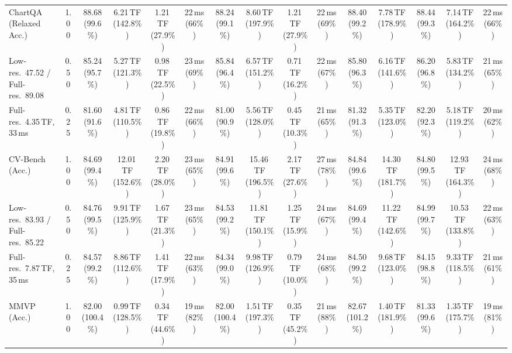 \begin{table}[t]
{\begin{tabular}{l c | c c c c | c c c c | c c | c c c}
\cmidrule(lr){1-15}
ChartQA (Relaxed Acc.) & 1.00 & \cellcolor{gray!15}88.68 (99.6\%) & 6.21\,TF (142.8\%) & 1.21\,TF (27.9\%) & 22\,ms (66\%) & \cellcolor{gray!15}88.24 (99.1\%) & 8.60\,TF (197.9\%) & 1.21\,TF (27.9\%) & 22\,ms (69\%) & \cellcolor{gray!15}88.40 (99.2\%) & 7.78\,TF (178.9\%) & \cellcolor{gray!15}88.44 (99.3\%) & 7.14\,TF (164.2\%) & 22\,ms (66\%) \\
{\footnotesize Low-res.\ 47.52 / Full-res.\ 89.08} & 0.50 & 85.24 (95.7\%) & 5.27\,TF (121.3\%) & 0.98\,TF (22.5\%) & 23\,ms (69\%) & 85.84 (96.4\%) & 6.57\,TF (151.2\%) & 0.71\,TF (16.2\%) & 22\,ms (67\%) & 85.80 (96.3\%) & 6.16\,TF (141.6\%) & 86.20 (96.8\%) & 5.83\,TF (134.2\%) & 21\,ms (65\%) \\
{\footnotesize Full-res.\ 4.35\,TF, 33\,ms} & 0.25 & 81.60 (91.6\%) & 4.81\,TF (110.5\%) & 0.86\,TF (19.8\%) & 22\,ms (66\%) & 81.00 (90.9\%) & 5.56\,TF (128.0\%) & 0.45\,TF (10.3\%) & 21\,ms (65\%) & 81.32 (91.3\%) & 5.35\,TF (123.0\%) & 82.20 (92.3\%) & 5.18\,TF (119.2\%) & 20\,ms (62\%) \\
\cmidrule(lr){1-15}
CV-Bench (Acc.) & 1.00 & \cellcolor{gray!15}84.69 (99.4\%) & 12.01\,TF (152.6\%) & 2.20\,TF (28.0\%) & 23\,ms (65\%) & \cellcolor{gray!15}84.91 (99.6\%) & 15.46\,TF (196.5\%) & 2.17\,TF (27.6\%) & 27\,ms (78\%) & \cellcolor{gray!15}84.84 (99.6\%) & 14.30\,TF (181.7\%) & \cellcolor{gray!15}84.80 (99.5\%) & 12.93\,TF (164.3\%) & 24\,ms (68\%) \\
{\footnotesize Low-res.\ 83.93 / Full-res.\ 85.22} & 0.50 & \cellcolor{gray!15}84.76 (99.5\%) & 9.91\,TF (125.9\%) & 1.67\,TF (21.3\%) & 23\,ms (65\%) & \cellcolor{gray!15}84.53 (99.2\%) & 11.81\,TF (150.1\%) & 1.25\,TF (15.9\%) & 24\,ms (67\%) & \cellcolor{gray!15}84.69 (99.4\%) & 11.22\,TF (142.6\%) & \cellcolor{gray!15}84.99 (99.7\%) & 10.53\,TF (133.8\%) & 22\,ms (63\%) \\
{\footnotesize Full-res.\ 7.87\,TF, 35\,ms} & 0.25 & \cellcolor{gray!15}84.57 (99.2\%) & 8.86\,TF (112.6\%) & 1.41\,TF (17.9\%) & 22\,ms (63\%) & \cellcolor{gray!15}84.34 (99.0\%) & 9.98\,TF (126.9\%) & 0.79\,TF (10.0\%) & 24\,ms (68\%) & \cellcolor{gray!15}84.50 (99.2\%) & 9.68\,TF (123.0\%) & \cellcolor{gray!15}84.15 (98.8\%) & 9.33\,TF (118.5\%) & 21\,ms (61\%) \\
\cmidrule(lr){1-15}
MMVP (Acc.) & 1.00 & \cellcolor{gray!15}82.00 (100.4\%) & 0.99\,TF (128.5\%) & 0.34\,TF (44.6\%) & 19\,ms (82\%) & \cellcolor{gray!15}82.00 (100.4\%) & 1.51\,TF (197.3\%) & 0.35\,TF (45.2\%) & 21\,ms (88\%) & \cellcolor{gray!15}82.67 (101.2\%) & 1.40\,TF (181.9\%) & \cellcolor{gray!15}81.33 (99.6\%) & 1.35\,TF (175.7\%) & 19\,ms (81\%) \\

\end{tabular}}
\end{table}

